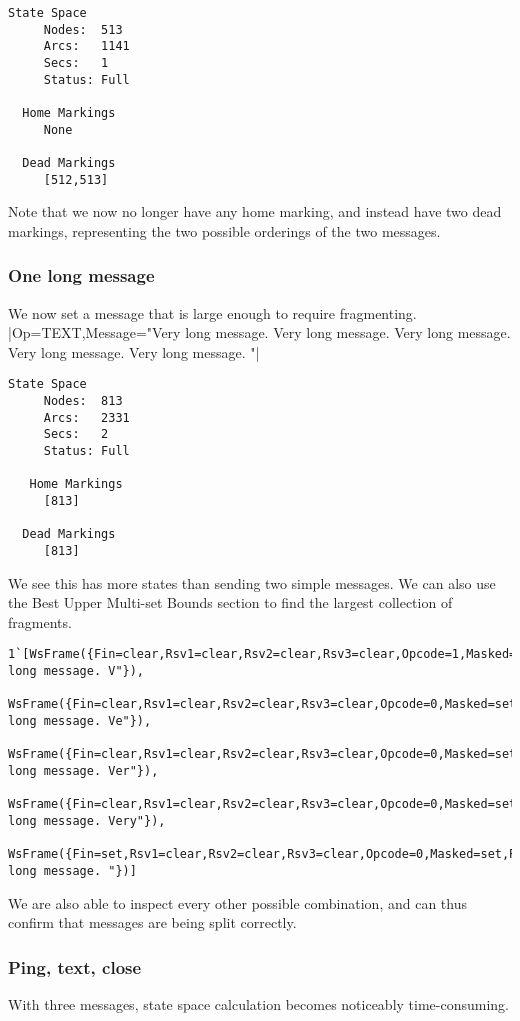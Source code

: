 	\begin{lstlisting}[language={}]
  State Space
     Nodes:  513
     Arcs:   1141
     Secs:   1
     Status: Full
     
  Home Markings
     None

  Dead Markings
     [512,513]
	\end{lstlisting}
	Note that we now no longer have any home marking, and instead have two dead
	markings, representing the two possible orderings of the two messages.
	
	\subsubsection{One long message}
	We now set a message that is large enough to require fragmenting. 
	|{Op=TEXT,Message="Very long message. Very long message. Very long message. Very long message. Very long message. "}|
	
	\begin{lstlisting}[language={}]
  State Space
     Nodes:  813
     Arcs:   2331
     Secs:   2
     Status: Full
     
   Home Markings
     [813]

  Dead Markings
     [813]
	\end{lstlisting}
	We see this has more states than sending two simple messages. We can also use
	the Best Upper Multi-set Bounds section to find the largest collection of
	fragments.
	\begin{lstlisting}[language={},gobble=1]
	1`[WsFrame({Fin=clear,Rsv1=clear,Rsv2=clear,Rsv3=clear,Opcode=1,Masked=set,Payload_length=20,Masking_key=Mask([0,0,0,0]),Payload="Very long message. V"}),
	WsFrame({Fin=clear,Rsv1=clear,Rsv2=clear,Rsv3=clear,Opcode=0,Masked=set,Payload_length=20,Masking_key=Mask([0,0,0,0]),Payload="ery long message. Ve"}),
	WsFrame({Fin=clear,Rsv1=clear,Rsv2=clear,Rsv3=clear,Opcode=0,Masked=set,Payload_length=20,Masking_key=Mask([0,0,0,0]),Payload="ry long message. Ver"}),
	WsFrame({Fin=clear,Rsv1=clear,Rsv2=clear,Rsv3=clear,Opcode=0,Masked=set,Payload_length=20,Masking_key=Mask([0,0,0,0]),Payload="y long message. Very"}),
	WsFrame({Fin=set,Rsv1=clear,Rsv2=clear,Rsv3=clear,Opcode=0,Masked=set,Payload_length=15,Masking_key=Mask([0,0,0,0]),Payload=" long message. "})]
	\end{lstlisting}
	We are also able to inspect every other possible combination, and can thus
	confirm that messages are being split correctly.

	\subsubsection{Ping, text, close}
	With three messages, state space calculation becomes noticeably time-consuming.
	
